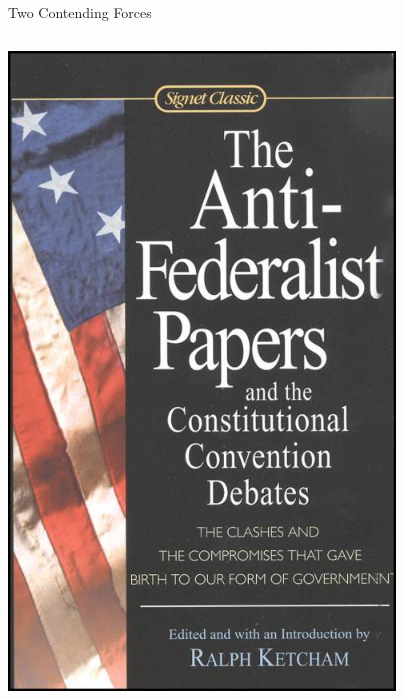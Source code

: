 \begin{frame}{Two Contending Forces}
\begin{columns}[onlytextwidth]
            \centering
            \includegraphics[width=0.8\textwidth]{img/anti-federalist.jpg} \\
    \end{columns}
\end{frame}

